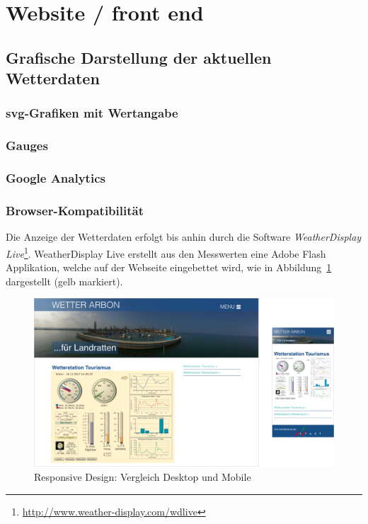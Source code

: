 \section{Website / front end}

\subsection{Grafische Darstellung der aktuellen Wetterdaten}

\subsubsection{svg-Grafiken mit Wertangabe}
\subsubsection{Gauges}


\subsubsection{Google Analytics}



\subsubsection*{Browser-Kompatibilität}
\label{subsec:flash}
Die Anzeige der Wetterdaten erfolgt bis anhin durch die Software \textit{WeatherDisplay Live}\footnote{ \url{http://www.weather-display.com/wdlive}}. WeatherDisplay Live erstellt aus den Messwerten eine Adobe Flash Applikation, welche auf der Webseite eingebettet wird, wie in Abbildung~\ref{img:responsive} dargestellt (gelb markiert).
\newline

\begin{figure}[h!]
	\centering
	\includegraphics[width=1\linewidth]{img/responsive}
	\caption{Responsive Design: Vergleich Desktop und Mobile}
	\label{img:responsive}
\end{figure}


